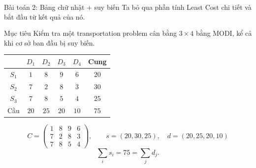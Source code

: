 \documentclass[10pt]{beamer}
\begin{document}
\begin{frame}{Bài toán 2: Bảng chữ nhật + suy biến}
    Ta bỏ qua phần tính Least Cost chi tiết và bắt đầu từ kết quả của nó.

    \vspace{0.3cm}
    \begin{block}{Mục tiêu}
        Kiểm tra một transportation problem cân bằng $3 \times 4$ bằng MODI, kể cả khi cơ sở ban đầu bị suy biến.
    \end{block}

    \vspace{0.1cm}
    \centering
    \renewcommand{\arraystretch}{1.15}
    \begin{tabular}{c|cccc|c}
        & $D_1$ & $D_2$ & $D_3$ & $D_4$ & Cung\\
        \hline
        $S_1$ & $1$ & $8$ & $9$ & $6$ & $20$\\
        $S_2$ & $7$ & $2$ & $8$ & $3$ & $30$\\
        $S_3$ & $7$ & $8$ & $5$ & $4$ & $25$\\
        \hline
        Cầu & $20$ & $25$ & $20$ & $10$ & $75$
    \end{tabular}

    \vspace{0.12cm}
    \[
        C =
        \begin{pmatrix}
            1 & 8 & 9 & 6\\
            7 & 2 & 8 & 3\\
            7 & 8 & 5 & 4
        \end{pmatrix},
        \qquad
        s=(20,30,25),\quad d=(20,25,20,10)
    \]
    \vspace{-0.1cm}
    \[
        \sum_i s_i = 75 = \sum_j d_j.
    \]
\end{frame}
\end{document}
